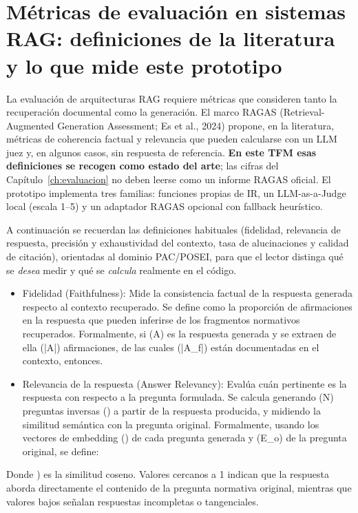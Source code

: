 \section{Métricas de evaluación en sistemas RAG: definiciones de la literatura y lo que mide este prototipo}
La evaluación de arquitecturas RAG requiere métricas que consideren tanto la recuperación documental como la generación. El marco RAGAS (Retrieval-Augmented Generation Assessment; Es et al., 2024) propone, en la literatura, métricas de coherencia factual y relevancia que pueden calcularse con un LLM juez y, en algunos casos, sin respuesta de referencia. \textbf{En este TFM esas definiciones se recogen como estado del arte}; las cifras del Capítulo~\ref{ch:evaluacion} no deben leerse como un informe RAGAS oficial. El prototipo implementa tres familias: funciones propias de IR, un LLM-as-a-Judge local (escala 1--5) y un adaptador RAGAS opcional con fallback heurístico.

A continuación se recuerdan las definiciones habituales (fidelidad, relevancia de respuesta, precisión y exhaustividad del contexto, tasa de alucinaciones y calidad de citación), orientadas al dominio PAC/POSEI, para que el lector distinga qué se \emph{desea} medir y qué se \emph{calcula} realmente en el código.

\begin{itemize}\item Fidelidad (Faithfulness): Mide la consistencia factual de la respuesta generada respecto al contexto recuperado. Se define como la proporción de afirmaciones en la respuesta que pueden inferirse de los fragmentos normativos recuperados. Formalmente, si (A) es la respuesta generada y se extraen de ella (|A|) afirmaciones, de las cuales (|A\_f|) están documentadas en el contexto, entonces.\end{itemize}
\begin{itemize}\item Relevancia de la respuesta (Answer Relevancy): Evalúa cuán pertinente es la respuesta con respecto a la pregunta formulada. Se calcula generando (N) preguntas inversas () a partir de la respuesta producida, y midiendo la similitud semántica con la pregunta original. Formalmente, usando los vectores de embedding () de cada pregunta generada y (E\_o) de la pregunta original, se define:\end{itemize}
Donde ) es la similitud coseno. Valores cercanos a 1 indican que la respuesta aborda directamente el contenido de la pregunta normativa original, mientras que valores bajos señalan respuestas incompletas o tangenciales.

